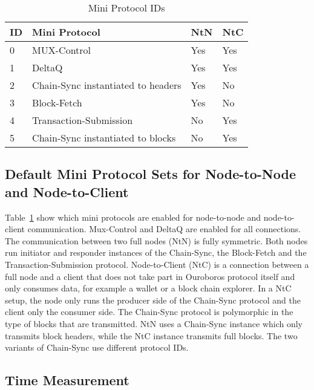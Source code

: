 \documentclass{report}
\theoremstyle{definition}{
  \newtheorem{lemma}{Lemma}[section] %
  \newtheorem{definition}[lemma]{Definition}
}
\theoremstyle{theorem}{
  \newtheorem{invariant}[lemma]{Invariant}
  \newtheorem{proofobligation}[lemma]{Proof Obligation}
}
\numberwithin{equation}{lemma}
\begin{document}
\begin{table}[h]
\centering
\begin{tabular}{|l|l|l|l|}
  \hline
  ID & Mini Protocol                         & NtN  & NtC \\ \hline
  0  & MUX-Control                           & Yes  & Yes \\ \hline
  1  & DeltaQ                                & Yes  & Yes \\ \hline
  2  & Chain-Sync instantiated to headers    & Yes  & No \\ \hline
  3  & Block-Fetch                           & Yes  & No  \\ \hline
  4  & Transaction-Submission                & No   & Yes  \\ \hline
  5  & Chain-Sync instantiated to blocks     & No   & Yes  \\ \hline
\end{tabular}
\caption{Mini Protocol IDs}
\label{mini-protocol-id}
\end{table}

\subsection{Default Mini Protocol Sets for Node-to-Node and Node-to-Client}
Table~\ref{mini-protocol-id} show which mini protocols are enabled for node-to-node
and node-to-client communication.
Mux-Control and DeltaQ are enabled for all connections.
The communication between two full nodes (NtN) is fully symmetric.
Both nodes run initiator and responder instances of the
Chain-Sync, the Block-Fetch and the Transaction-Submission protocol.
Node-to-Client (NtC) is a connection between a full node and a client that does not take part in
Ouroboros protocol itself and only consumes data, for example a wallet or a block chain explorer.
In a NtC setup, the node only runs the producer side of the Chain-Sync protocol and the client only the
consumer side.
The Chain-Sync protocol is polymorphic in the type of blocks that are transmitted.
NtN uses a Chain-Sync instance which only transmits block headers, while the NtC instance transmits
full blocks.
The two variants of Chain-Sync use different protocol IDs.

%

\subsection{Time Measurement}
\end{document}
